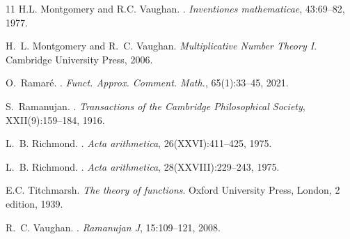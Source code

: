 \documentclass[12pt, oneside,reqno]{amsart}
\numberwithin{equation}{section}
\begin{document}
\begin{thebibliography}{11}
H.L. Montgomery and R.C. Vaughan.
.
\newblock \textit{Inventiones mathematicae}, 43:69--82, 1977.

H.~L. Montgomery and R.~C. Vaughan.
\newblock \textit{Multiplicative Number Theory I}.
\newblock Cambridge University Press, 2006.

O.~Ramar{\'{e}}.
.
\newblock \textit{Funct. Approx. Comment. Math.}, 65(1):33--45, 2021.

S.~Ramanujan.
.
\newblock \textit{Transactions of the Cambridge Philosophical Society},
  XXII(9):159--184, 1916.

L.~B. Richmond.
.
\newblock \textit{Acta arithmetica}, 26(XXVI):411--425, 1975.

L.~B. Richmond.
.
\newblock \textit{Acta arithmetica}, 28(XXVIII):229--243, 1975.


E.C. Titchmarsh.
\newblock \textit{The theory of functions}.
\newblock Oxford University Press, London, 2 edition, 1939.

R.~C. Vaughan.
.
\newblock \textit{Ramanujan J}, 15:109--121, 2008.

\end{thebibliography}
\end{document}
